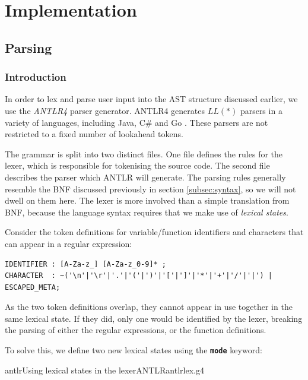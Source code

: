 \documentclass[a4paper,openany,12pt]{book}
\begin{document}
\section{Implementation}

\subsection{Parsing}

\subsubsection{Introduction}

In order to lex and parse user input into the AST structure discussed earlier, we use the \emph{ANTLR4} parser generator.
ANTLR4 generates $LL(*)$ parsers in a variety of languages, including Java, C\# and Go \citep{parr2011ll}.
These parsers are not restricted to a fixed number of lookahead tokens.

The grammar is split into two distinct files.
One file defines the rules for the lexer, which is responsible for tokenising the source code.
The second file describes the parser which ANTLR will generate.
The parsing rules generally resemble the BNF discussed previously in section \ref{subsec:syntax}, so we will not
dwell on them here.
The lexer is more involved than a simple translation from BNF, because the language syntax requires that we make use of
\emph{lexical states}.

Consider the token definitions for variable/function identifiers and characters that can appear in a regular expression:

\begin{verbatim}
IDENTIFIER : [A-Za-z_] [A-Za-z_0-9]* ;
CHARACTER  : ~('\n'|'\r'|'.'|'('|')'|'['|']'|'*'|'+'|'/'|'|') | ESCAPED_META;
\end{verbatim}

As the two token definitions overlap, they cannot appear in use together in the same lexical state.
If they did, only one would be identified by the lexer, breaking the parsing of either the regular expressions, or the
function definitions.

To solve this, we define two new lexical states using the \textbf{\texttt{mode}} keyword:

\begin{mycodefile}{antlr}{\label{code:antlr:1}Using lexical states in the lexer}{ANTLR}{antlrlex.g4}
\end{mycodefile}
\end{document}
